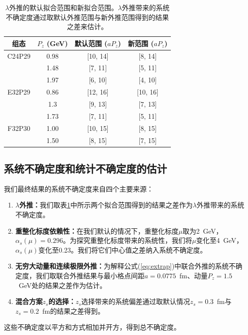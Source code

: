 \documentclass[12pt,a4paper]{ctexart}
\begin{document}
\begin{table}[H]
\centering
\caption{$\lambda$外推的默认拟合范围和新拟合范围。$\lambda$外推带来的系统不确定度通过取默认外推范围与新外推范围得到的结果之差来估计。}
\label{tab:lambda_fit}
\begin{tabular}{cccc}
\toprule
组态 & $P_z$ (GeV) & 默认范围 ($aP_z$) & 新范围 ($aP_z$) \\
\midrule
C24P29 & 0.98 & [10, 14] & [8, 14] \\
        & 1.48 & [7, 11]  & [5, 11] \\
        & 1.97 & [6, 10]  & [4, 10] \\
\midrule
E32P29 & 0.86 & [12, 16] & [10, 16] \\
        & 1.3  & [9, 13]  & [7, 13] \\
        & 1.73 & [7, 11]  & [5, 11] \\
\midrule
F32P30 & 1.00 & [10, 15] & [8, 15] \\
        & 1.50 & [8, 15]  & [7, 15] \\
\bottomrule
\end{tabular}
\end{table}

\subsection*{系统不确定度和统计不确定度的估计}

我们最终结果的系统不确定度来自四个主要来源：

\begin{enumerate}[label=(\arabic*)]
    \item \textbf{$\lambda$外推：}我们取表\ref{tab:lambda_fit}中所示两个拟合范围得到的结果之差作为$\lambda$外推带来的系统不确定度。
    \item \textbf{重整化标度依赖性：}在我们默认的情况下，重整化标度$\mu$取为2~GeV，$\alpha_s(\mu) = 0.296$。为探究重整化标度带来的系统性，我们将$\mu$变化至4~GeV，$\alpha_s(\mu)$变化至0.23。我们将它们中心值之差纳入系统不确定度。
    \item \textbf{无穷大动量和连续极限外推：}为解释公式(\ref{eq:extrap})中联合外推的系统不确定度，我们取联合外推结果与最小格点间距$a = 0.0775$~fm、动量$P_z = 1.5$~GeV处的结果之差作为估计。
    \item \textbf{混合方案$z_s$的选择：}$z_s$选择带来的系统偏差通过取默认情况$z_s = 0.3$~fm与$z_s = 0.2$~fm的结果之差得到。
\end{enumerate}

这些不确定度以平方和方式相加并开方，得到总不确定度。
\end{document}
